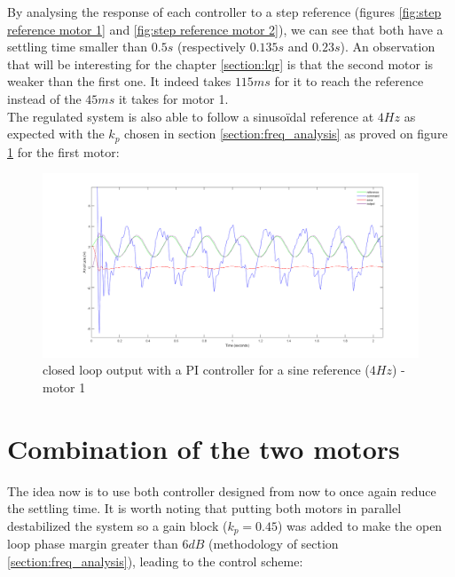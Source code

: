 By analysing the response of each controller to a step reference (figures \ref{fig:step reference motor 1} and 
\ref{fig:step reference motor 2}), we can see that both have
a settling time smaller than $0.5 s$ (respectively $0.135 s$ and $0.23 s$). An observation
that will be interesting for the chapter \ref{section:lqr} is that the second motor is 
weaker than the first one. It indeed takes $115 ms$ for it to reach the reference instead of
the $45 ms$ it takes for motor 1. \\
The regulated system is also able to follow a sinusoïdal reference at $4 Hz$ as expected with
the $k_p$ chosen in section \ref{section:freq_analysis} as proved on figure 
\ref{fig:sin reference motor 1} for the first motor:

\begin{figure}
    \centering
    \includegraphics[width=\textwidth]{Pictures/sinRef_motor1.png}
    \caption{closed loop output with a PI controller for a sine reference ($4 Hz$) - motor 1}
    \label{fig:sin reference motor 1}
\end{figure}

\section{Combination of the two motors}

The idea now is to use both controller designed from now to once again reduce the settling 
time. It is worth noting that putting both motors in parallel destabilized the system so a 
gain block ($k_p = 0.45$) was added to make the open loop phase margin greater than $6 dB$ (methodology of
section \ref{section:freq_analysis}), leading to the control scheme:


